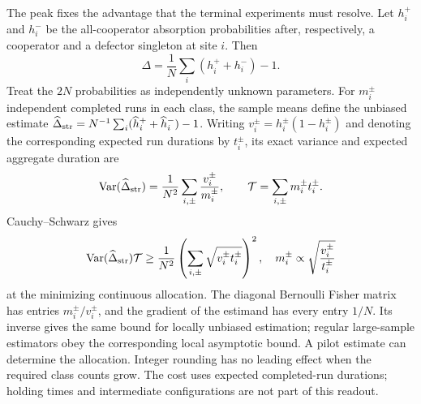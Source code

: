 \documentclass[aps,pre,reprint,amsmath,amssymb,longbibliography]{revtex4-2}
\begin{document}
The peak fixes the advantage that the terminal experiments must resolve.
Let $h_i^+$ and $h_i^-$ be the all-cooperator absorption
probabilities after, respectively, a cooperator and a defector
singleton at site $i$. Then
\begin{equation}
 \Delta=\frac1N\sum_i(h_i^++h_i^-)-1.
 \label{eq:v7-stratified-estimand}
\end{equation}
Treat the $2N$ probabilities as independently unknown parameters.
For $m_i^{\pm}$ independent completed runs in each class, the
sample means define the unbiased estimate
$\widehat\Delta_{\rm str}=N^{-1}\sum_i
(\widehat h_i^++\widehat h_i^-)-1$.
Writing $v_i^{\pm}=h_i^{\pm}(1-h_i^{\pm})$ and denoting the
corresponding expected run durations by $t_i^{\pm}$, its exact
variance and expected aggregate duration are
\begin{equation}
 \operatorname{Var}(\widehat\Delta_{\rm str})
 =\frac1{N^2}\sum_{i,\pm}\frac{v_i^{\pm}}{m_i^{\pm}},
 \qquad
 \mathcal T=\sum_{i,\pm}m_i^{\pm}t_i^{\pm}.
 \label{eq:v7-stratified-variance}
\end{equation}
Cauchy--Schwarz gives
\begin{equation}
 \operatorname{Var}(\widehat\Delta_{\rm str})\mathcal T
 \ge\frac1{N^2}
 \left(\sum_{i,\pm}\sqrt{v_i^{\pm}t_i^{\pm}}\right)^2,
 \quad
 m_i^{\pm}\propto\sqrt{\frac{v_i^{\pm}}{t_i^{\pm}}}
 \label{eq:v7-stratified-time-bound}
\end{equation}
at the minimizing continuous allocation. The diagonal Bernoulli
Fisher matrix has entries $m_i^{\pm}/v_i^{\pm}$, and the gradient
of the estimand has every entry $1/N$. Its inverse gives the same
bound for locally unbiased estimation; regular large-sample
estimators obey the corresponding local asymptotic bound.
A pilot estimate can determine the allocation. Integer rounding
has no leading effect when the required class counts grow.
The cost uses expected completed-run durations; holding times and
intermediate configurations are not part of this readout.
\end{document}
